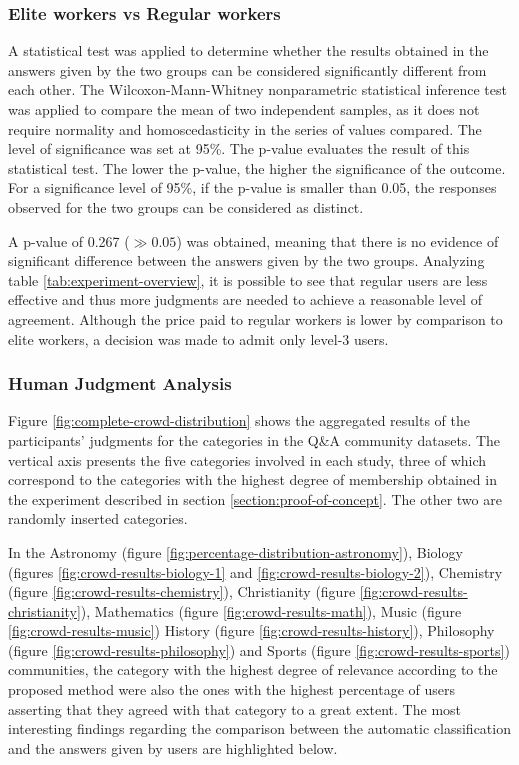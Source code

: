 \subsubsection{\hspace*{3pt} Elite workers vs Regular workers}


A statistical test was applied to determine whether the results obtained in the answers given by the two groups can be considered significantly different from each other. The Wilcoxon-Mann-Whitney nonparametric statistical inference test was applied \cite{feltovich2003nonparametric} to compare the mean of two independent samples, as it does not require normality and homoscedasticity in the series of values compared. The level of significance was set at 95\%. The p-value evaluates the result of this statistical test. The lower the p-value, the higher the significance of the outcome. For a significance level of 95\%, if the p-value is smaller than 0.05, the responses observed for the two groups can be considered as distinct. 

A p-value of 0.267 ($\gg 0.05$) was obtained, meaning that there is no evidence of significant difference between the answers given by the two groups. Analyzing table \ref{tab:experiment-overview}, it is possible to see that regular users are less effective and thus more judgments are needed to achieve a reasonable level of agreement. Although the price paid to regular workers is lower by comparison to elite workers, a decision was made to admit only level-3 users.

\subsubsection{\hspace*{3pt} Human Judgment Analysis}

Figure \ref{fig:complete-crowd-distribution} shows the aggregated results of the participants' judgments for the categories in the Q\&A community datasets. The vertical axis presents the five categories involved in each study, three of which correspond to the categories with the highest degree of membership obtained in the experiment described in section \ref{section:proof-of-concept}. The other two are randomly inserted categories.

In the Astronomy (figure \ref{fig:percentage-distribution-astronomy}), Biology (figures \ref{fig:crowd-results-biology-1} and \ref{fig:crowd-results-biology-2}), Chemistry (figure \ref{fig:crowd-results-chemistry}), Christianity (figure \ref{fig:crowd-results-christianity}), Mathematics (figure \ref{fig:crowd-results-math}), Music (figure \ref{fig:crowd-results-music}) History (figure \ref{fig:crowd-results-history}), Philosophy (figure \ref{fig:crowd-results-philosophy}) and Sports (figure \ref{fig:crowd-results-sports}) communities, the category with the highest degree of relevance according to the proposed method were also the ones with the highest percentage of users asserting that they agreed with that category to a great extent. The most interesting findings regarding the comparison between the automatic classification and the answers given by users are highlighted below.

